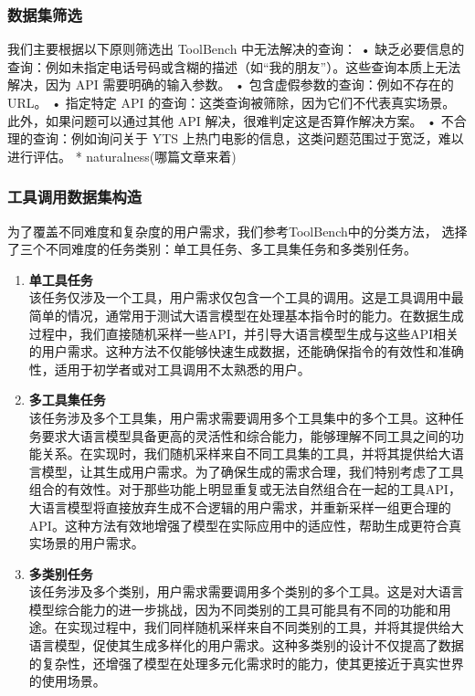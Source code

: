\subsubsection{数据集筛选}

我们主要根据以下原则筛选出 ToolBench 中无法解决的查询：
	•	缺乏必要信息的查询：例如未指定电话号码或含糊的描述（如“我的朋友”）。这些查询本质上无法解决，因为 API 需要明确的输入参数。
	•	包含虚假参数的查询：例如不存在的 URL。
	•	指定特定 API 的查询：这类查询被筛除，因为它们不代表真实场景。此外，如果问题可以通过其他 API 解决，很难判定这是否算作解决方案。
	•	不合理的查询：例如询问关于 YTS 上热门电影的信息，这类问题范围过于宽泛，难以进行评估。
  * naturalness(哪篇文章来着)

\subsubsection{工具调用数据集构造}

为了覆盖不同难度和复杂度的用户需求，我们参考ToolBench中的分类方法，
选择了三个不同难度的任务类别：单工具任务、多工具集任务和多类别任务。

\begin{enumerate}
  \item \textbf{单工具任务} \\
    该任务仅涉及一个工具，用户需求仅包含一个工具的调用。这是工具调用中最简单的情况，通常用于测试大语言模型在处理基本指令时的能力。在数据生成过程中，我们直接随机采样一些API，并引导大语言模型生成与这些API相关的用户需求。这种方法不仅能够快速生成数据，还能确保指令的有效性和准确性，适用于初学者或对工具调用不太熟悉的用户。

  \item \textbf{多工具集任务} \\
    该任务涉及多个工具集，用户需求需要调用多个工具集中的多个工具。这种任务要求大语言模型具备更高的灵活性和综合能力，能够理解不同工具之间的功能关系。在实现时，我们随机采样来自不同工具集的工具，并将其提供给大语言模型，让其生成用户需求。为了确保生成的需求合理，我们特别考虑了工具组合的有效性。对于那些功能上明显重复或无法自然组合在一起的工具API，大语言模型将直接放弃生成不合逻辑的用户需求，并重新采样一组更合理的API。这种方法有效地增强了模型在实际应用中的适应性，帮助生成更符合真实场景的用户需求。

  \item \textbf{多类别任务} \\
    该任务涉及多个类别，用户需求需要调用多个类别的多个工具。这是对大语言模型综合能力的进一步挑战，因为不同类别的工具可能具有不同的功能和用途。在实现过程中，我们同样随机采样来自不同类别的工具，并将其提供给大语言模型，促使其生成多样化的用户需求。这种多类别的设计不仅提高了数据的复杂性，还增强了模型在处理多元化需求时的能力，使其更接近于真实世界的使用场景。

\end{enumerate}

